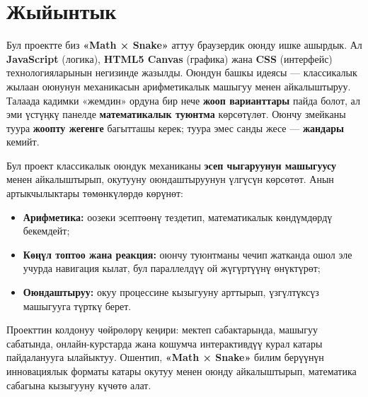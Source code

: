 \documentclass[12pt]{article}
\begin{document}
\section{Жыйынтык}
Бул проектте биз \textbf{«Math × Snake»} аттуу браузердик оюнду ишке ашырдык. Ал \textbf{JavaScript} (логика), \textbf{HTML5 Canvas} (графика) жана \textbf{CSS} (интерфейс) технологияларынын негизинде жазылды.  
Оюндун башкы идеясы — классикалык жылаан оюнунун механикасын арифметикалык машыгуу менен айкалыштыруу. Талаада кадимки «жемдин» ордуна бир нече \textbf{жооп варианттары} пайда болот, ал эми үстүңкү панелде \textbf{математикалык туюнтма} көрсөтүлөт. Оюнчу змейканы туура \textbf{жоопту жегенге} багытташы керек; туура эмес санды жесе — \textbf{жандары} кемийт.

Бул проект классикалык оюндук механиканы \textbf{эсеп чыгаруунун машыгуусу} менен айкалыштырып, окутууну оюндаштыруунун үлгүсүн көрсөтөт. Анын артыкчылыктары төмөнкүлөрдө көрүнөт:
\begin{itemize}
  \item \textbf{Арифметика:} оозеки эсептөөнү тездетип, математикалык көндүмдөрдү бекемдейт;
  \item \textbf{Көңүл топтоо жана реакция:} оюнчу туюнтманы чечип жатканда ошол эле учурда навигация кылат, бул параллелдүү ой жүгүртүүнү өнүктүрөт;
  \item \textbf{Оюндаштыруу:} окуу процессине кызыгууну арттырып, үзгүлтүксүз машыгууга түрткү берет.
\end{itemize}

Проекттин колдонуу чөйрөлөрү кеңири: мектеп сабактарында, машыгуу сабатында, онлайн-курстарда жана кошумча интерактивдүү курал катары пайдаланууга ылайыктуу. Ошентип, \textbf{«Math × Snake»} билим берүүнүн инновациялык форматы катары окутуу менен оюнду айкалыштырып, математика сабагына кызыгууну күчөтө алат.
\end{document}
